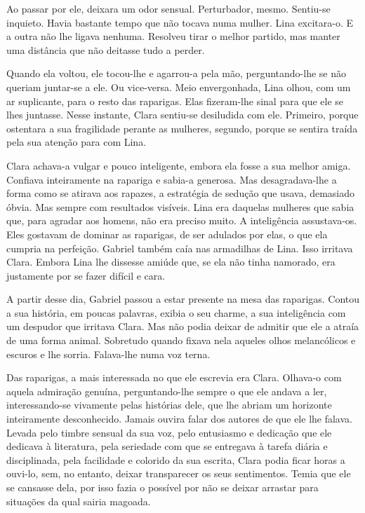 Ao passar por ele, deixara um odor sensual. Perturbador, mesmo.
Sentiu-se inquieto. Havia bastante tempo que não tocava numa mulher.
Lina excitara-o. E a outra não lhe ligava nenhuma. Resolveu tirar o
melhor partido, mas manter uma distância que não deitasse tudo a perder.

Quando ela voltou, ele tocou-lhe e agarrou-a pela mão, perguntando-lhe
se não queriam juntar-se a ele. Ou vice-versa. Meio envergonhada, Lina
olhou, com um ar suplicante, para o resto das raparigas. Elas
fizeram-lhe sinal para que ele se lhes juntasse. Nesse instante, Clara
sentiu-se desiludida com ele. Primeiro, porque ostentara a sua
fragilidade perante as mulheres, segundo, porque se sentira traída pela
sua atenção para com Lina.

Clara achava-a vulgar e pouco inteligente, embora ela fosse a sua melhor
amiga. Confiava inteiramente na rapariga e sabia-a generosa. Mas
desagradava-lhe a forma como se atirava aos rapazes, a estratégia de
sedução que usava, demasiado óbvia. Mas sempre com resultados visíveis.
Lina era daquelas mulheres que sabia que, para agradar aos homens, não
era preciso muito. A inteligência assustava-os. Eles gostavam de dominar
as raparigas, de ser adulados por elas, o que ela cumpria na perfeição.
Gabriel também caía nas armadilhas de Lina. Isso irritava Clara. Embora
Lina lhe dissesse amiúde que, se ela não tinha namorado, era justamente
por se fazer difícil e cara.

A partir desse dia, Gabriel passou a estar presente na mesa das
raparigas. Contou a sua história, em poucas palavras, exibia o seu
charme, a sua inteligência com um despudor que irritava Clara. Mas não
podia deixar de admitir que ele a atraía de uma forma animal. Sobretudo
quando fixava nela aqueles olhos melancólicos e escuros e lhe sorria.
Falava-lhe numa voz terna.

Das raparigas, a mais interessada no que ele escrevia era Clara.
Olhava-o com aquela admiração genuína, perguntando-lhe sempre o que ele
andava a ler, interessando-se vivamente pelas histórias dele, que lhe
abriam um horizonte inteiramente desconhecido. Jamais ouvira falar dos
autores de que ele lhe falava. Levada pelo timbre sensual da sua voz,
pelo entusiasmo e dedicação que ele dedicava à literatura, pela
seriedade com que se entregava à tarefa diária e disciplinada, pela
facilidade e colorido da sua escrita, Clara podia ficar horas a ouvi-lo,
sem, no entanto, deixar transparecer os seus sentimentos. Temia que ele
se cansasse dela, por isso fazia o possível por não se deixar arrastar
para situações da qual sairia magoada.

